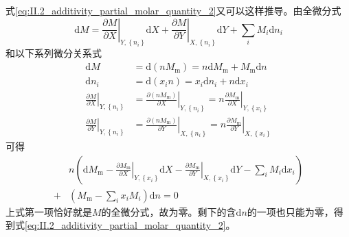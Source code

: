 \documentclass[main.tex]{subfiles}
\begin{document}
式\eqref{eq:II.2_additivity_partial_molar_quantity_2}又可以这样推导。由全微分式
\[\mathrm{d}M=\left.\frac{\partial M}{\partial X}\right|_{Y,\left\{n_i\right\}}\mathrm{d}X+\left.\frac{\partial M}{\partial Y}\right|_{X,\left\{n_i\right\}}\mathrm{d}Y+\sum_i M_i\mathrm{d}n_i\]
和以下系列微分关系式
\begin{align*}
  \mathrm{d}M                                                       & =\mathrm{d}\left(nM_\text{m}\right)=n\mathrm{d}M_\text{m}+M_\text{m}\mathrm{d}n                                                                                       \\
  \mathrm{d}n_i                                                     & =\mathrm{d}\left(x_i n\right)=x_i\mathrm{d}n_i+n\mathrm{d}x_i                                                                                                         \\
  \left.\frac{\partial M}{\partial X}\right|_{Y,\left\{n_i\right\}} & =\left.\frac{\partial \left(nM_\text{m}\right)}{\partial X}\right|_{Y,\left\{n_i\right\}}=n\left.\frac{\partial M_\text{m}}{\partial X}\right|_{Y,\left\{x_i\right\}} \\
  \left.\frac{\partial M}{\partial Y}\right|_{Y,\left\{n_i\right\}} & =\left.\frac{\partial\left(nM_\text{m}\right)}{\partial Y}\right|_{X,\left\{n_i\right\}}=n\left.\frac{\partial M_\text{m}}{\partial Y}\right|_{X,\left\{x_i\right\}}
\end{align*}
可得
\begin{align*}
    & n\left(\mathrm{d}M_\text{m}-\left.\frac{\partial M_\text{m}}{\partial X}\right|_{Y,\left\{x_i\right\}}\mathrm{d}X-\left.\frac{\partial M_\text{m}}{\partial Y}\right|_{X,\left\{x_i\right\}}\mathrm{d}Y-\sum_iM_i\mathrm{d}x_i\right) \\
  + & \left(M_\text{m}-\sum_ix_iM_i\right)\mathrm{d}n=0
\end{align*}
上式第一项恰好就是$M$的全微分式，故为零。剩下的含$\mathrm{d}n$的一项也只能为零，得到式\eqref{eq:II.2_additivity_partial_molar_quantity_2}。
\end{document}
